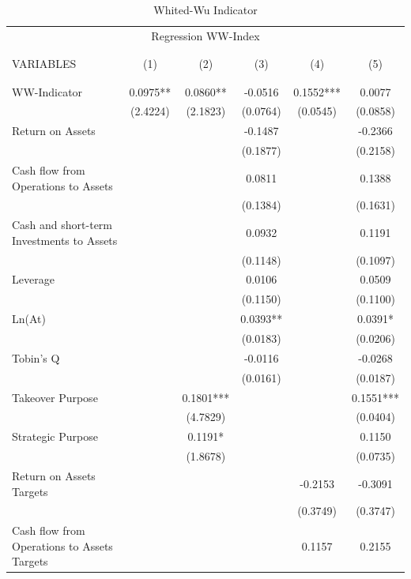 \documentclass[12pt]{article}
\begin{document}
	\begin{table}[ht]
	\centering
	\caption{Whited-Wu Indicator}

	\begin{adjustbox}{height=10cm, max width=\textwidth}
		
		\begin{tabular}{lccccc}
			\\
			\multicolumn{6}{c}{Regression WW-Index} \\ \\ \hline
			 \\
			VARIABLES  & (1) & (2) & (3) & (4) & (5) \\ \\ \hline
			 &  &  &  &  &  \\
			WW-Indicator & 0.0975** & 0.0860** & -0.0516 & 0.1552*** & 0.0077 \\
			 & (2.4224) & (2.1823) & (0.0764) & (0.0545) & (0.0858) \\
			Return on Assets &  &  & -0.1487 &  & -0.2366 \\
			 &  &  & (0.1877) &  & (0.2158) \\
			Cash flow from Operations to Assets &  &  & 0.0811 &  & 0.1388 \\
			 &  &  & (0.1384) &  & (0.1631) \\
			Cash and short-term Investments to Assets &  &  & 0.0932 &  & 0.1191 \\
			 &  &  & (0.1148) &  & (0.1097) \\
			Leverage &  &  & 0.0106 &  & 0.0509 \\
			 &  &  & (0.1150) &  & (0.1100) \\
			Ln(At) &  &  & 0.0393** &  & 0.0391* \\
			 &  &  & (0.0183) &  & (0.0206) \\
			Tobin's Q &  &  & -0.0116 &  & -0.0268 \\
			 &  &  & (0.0161) &  & (0.0187) \\
			Takeover Purpose &  & 0.1801*** &  &  & 0.1551*** \\
			 &  & (4.7829) &  &  & (0.0404) \\
			Strategic Purpose &  & 0.1191* &  &  & 0.1150 \\
			 &  & (1.8678) &  &  & (0.0735) \\
			Return on Assets Targets &  &  &  & -0.2153 & -0.3091 \\
			 &  &  &  & (0.3749) & (0.3747) \\
			Cash flow from Operations to Assets Targets &  &  &  & 0.1157 & 0.2155 \\

\end{tabular}
\end{adjustbox}
\end{table}
\end{document}
